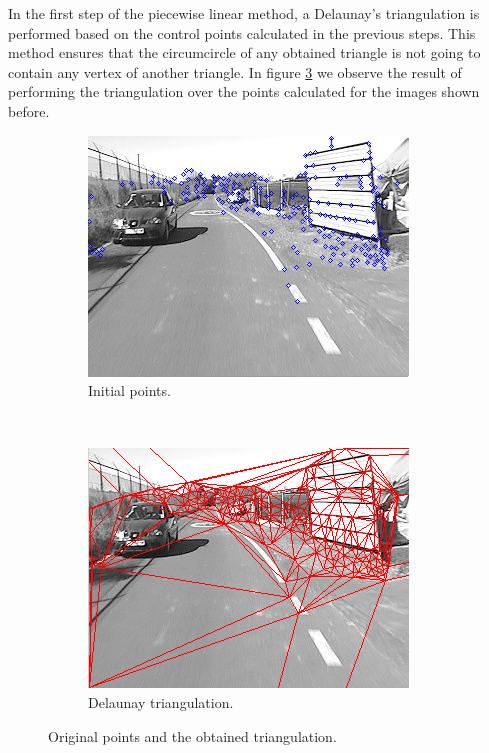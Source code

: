 In the first step of the piecewise linear method, a Delaunay’s triangulation is performed based on the control points calculated in the previous steps. This method ensures that the circumcircle of any obtained triangle is not going to contain any vertex of another triangle. In figure \ref{fig:cp01_triangulation} we observe the result of performing the triangulation over the points calculated for the images shown before.

\begin{figure}[h!]
        \centering
        \begin{subfigure}[b]{0.45\textwidth}
                \centering
                \includegraphics[width=\textwidth]{triangulation1}
                \caption{Initial points.}\label{fig:cp01_triangulation_1}
        \end{subfigure}%
        ~ %
        \begin{subfigure}[b]{0.45\textwidth}
                \centering
                \includegraphics[width=\textwidth]{triangulation2}
                \caption{Delaunay triangulation.}\label{fig:cp01_triangulation_2}
        \end{subfigure}%
        \caption{Original points and the obtained triangulation.}\label{fig:cp01_triangulation}
\end{figure}

